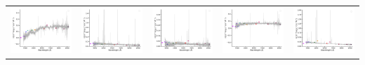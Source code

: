 \begin{center}
\begin{longtable}{l l l l l }
    \includegraphics[width=0.2\linewidth, clip]{Figs/Figs-sdss/spec-1101-52621-0223-SPLUS-s02s12-030410.pdf} & \includegraphics[width=0.2\linewidth, clip]{Figs/Figs-sdss/spec-1102-52883-0155-STRIPE82-0139-036676.pdf} & \includegraphics[width=0.2\linewidth, clip]{Figs/Figs-sdss/spec-1103-52873-0382-STRIPE82-0136-022276.pdf} & \includegraphics[width=0.2\linewidth, clip]{Figs/Figs-sdss/spec-1103-52873-0393-STRIPE82-0136-015923.pdf} & \includegraphics[width=0.2\linewidth, clip]{Figs/Figs-sdss/spec-1106-52912-0102-SPLUS-s02s05-046746.pdf} \\

\end{longtable}
\end{center}
